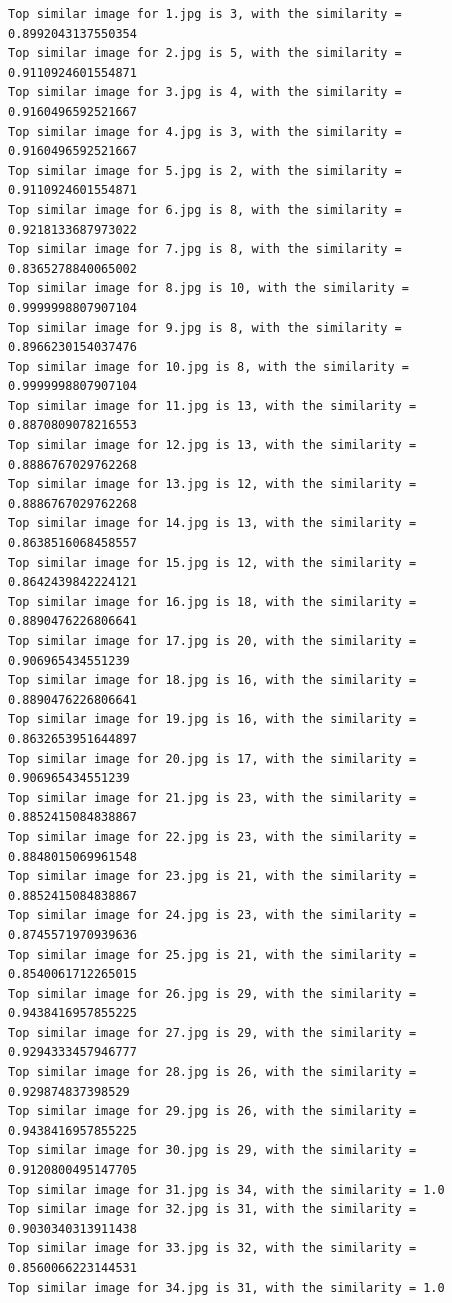\documentclass{article}
\begin{document}
\begin{lstlisting}
Top similar image for 1.jpg is 3, with the similarity = 0.8992043137550354
Top similar image for 2.jpg is 5, with the similarity = 0.9110924601554871
Top similar image for 3.jpg is 4, with the similarity = 0.9160496592521667
Top similar image for 4.jpg is 3, with the similarity = 0.9160496592521667
Top similar image for 5.jpg is 2, with the similarity = 0.9110924601554871
Top similar image for 6.jpg is 8, with the similarity = 0.9218133687973022
Top similar image for 7.jpg is 8, with the similarity = 0.8365278840065002
Top similar image for 8.jpg is 10, with the similarity = 0.9999998807907104
Top similar image for 9.jpg is 8, with the similarity = 0.8966230154037476
Top similar image for 10.jpg is 8, with the similarity = 0.9999998807907104
Top similar image for 11.jpg is 13, with the similarity = 0.8870809078216553
Top similar image for 12.jpg is 13, with the similarity = 0.8886767029762268
Top similar image for 13.jpg is 12, with the similarity = 0.8886767029762268
Top similar image for 14.jpg is 13, with the similarity = 0.8638516068458557
Top similar image for 15.jpg is 12, with the similarity = 0.8642439842224121
Top similar image for 16.jpg is 18, with the similarity = 0.8890476226806641
Top similar image for 17.jpg is 20, with the similarity = 0.906965434551239
Top similar image for 18.jpg is 16, with the similarity = 0.8890476226806641
Top similar image for 19.jpg is 16, with the similarity = 0.8632653951644897
Top similar image for 20.jpg is 17, with the similarity = 0.906965434551239
Top similar image for 21.jpg is 23, with the similarity = 0.8852415084838867
Top similar image for 22.jpg is 23, with the similarity = 0.8848015069961548
Top similar image for 23.jpg is 21, with the similarity = 0.8852415084838867
Top similar image for 24.jpg is 23, with the similarity = 0.8745571970939636
Top similar image for 25.jpg is 21, with the similarity = 0.8540061712265015
Top similar image for 26.jpg is 29, with the similarity = 0.9438416957855225
Top similar image for 27.jpg is 29, with the similarity = 0.9294333457946777
Top similar image for 28.jpg is 26, with the similarity = 0.929874837398529
Top similar image for 29.jpg is 26, with the similarity = 0.9438416957855225
Top similar image for 30.jpg is 29, with the similarity = 0.9120800495147705
Top similar image for 31.jpg is 34, with the similarity = 1.0
Top similar image for 32.jpg is 31, with the similarity = 0.9030340313911438
Top similar image for 33.jpg is 32, with the similarity = 0.8560066223144531
Top similar image for 34.jpg is 31, with the similarity = 1.0

\end{lstlisting}
\end{document}
